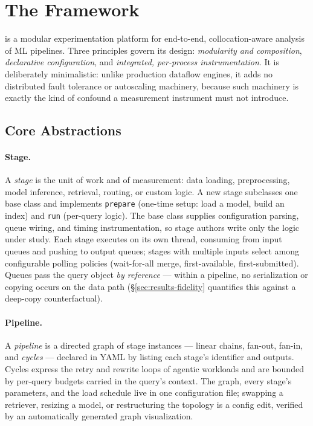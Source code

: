 \section{The \sysname{} Framework}
\label{sec:framework}

\sysname{} is a modular experimentation platform for end-to-end,
collocation-aware analysis of ML pipelines. Three principles govern its
design: \emph{modularity and composition}, \emph{declarative configuration},
and \emph{integrated, per-process instrumentation}. It is deliberately
minimalistic: unlike production dataflow engines, it adds no distributed
fault tolerance or autoscaling machinery, because such machinery is exactly
the kind of confound a measurement instrument must not introduce.

\subsection{Core Abstractions}
\label{sec:framework-abstractions}

\paragraph{Stage.} A \emph{stage} is the unit of work and of measurement:
data loading, preprocessing, model inference, retrieval, routing, or custom
logic. A new stage subclasses one base class and implements \texttt{prepare}
(one-time setup: load a model, build an index) and \texttt{run} (per-query
logic). The base class supplies configuration parsing, queue wiring, and
timing instrumentation, so stage authors write only the logic under study.
Each stage executes on its own thread, consuming from input queues and
pushing to output queues; stages with multiple inputs select among
configurable polling policies (wait-for-all merge, first-available,
first-submitted). Queues pass the query object \emph{by reference} --- within
a pipeline, no serialization or copying occurs on the data path
(\S\ref{sec:results-fidelity} quantifies this against a deep-copy counterfactual).

\paragraph{Pipeline.} A \emph{pipeline} is a directed graph of stage
instances --- linear chains, fan-out, fan-in, and \emph{cycles} --- declared
in YAML by listing each stage's identifier and outputs. Cycles express the
retry and rewrite loops of agentic workloads and are bounded by per-query
budgets carried in the query's context. The graph, every stage's parameters,
and the load schedule live in one configuration file; swapping a retriever,
resizing a model, or restructuring the topology is a config edit,
verified by an automatically generated graph visualization.

